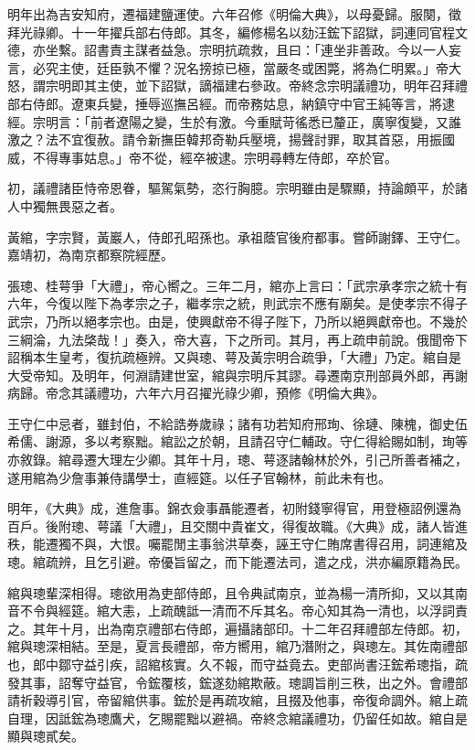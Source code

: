 \begin{pinyinscope}
明年出為吉安知府，遷福建鹽運使。六年召修《明倫大典》，以母憂歸。服闋，徵拜光祿卿。十一年擢兵部右侍郎。其冬，編修楊名以劾汪鋐下詔獄，詞連同官程文德，亦坐繫。詔書責主謀者益急。宗明抗疏救，且曰：「連坐非善政。今以一人妄言，必究主使，廷臣孰不懼？況名搒掠已極，當嚴冬或困斃，將為仁明累。」帝大怒，謂宗明即其主使，並下詔獄，謫福建右參政。帝終念宗明議禮功，明年召拜禮部右侍郎。遼東兵變，捶辱巡撫呂經。而帝務姑息，納鎮守中官王純等言，將逮經。宗明言：「前者遼陽之變，生於有激。今重賦苛徭悉已釐正，廣寧復變，又誰激之？法不宜復赦。請令新撫臣韓邦奇勒兵壓境，揚聲討罪，取其首惡，用振國威，不得專事姑息。」帝不從，經卒被逮。宗明尋轉左侍郎，卒於官。

初，議禮諸臣恃帝恩眷，驅駕氣勢，恣行胸臆。宗明雖由是驟顯，持論頗平，於諸人中獨無畏惡之者。

黃綰，字宗賢，黃巖人，侍郎孔昭孫也。承祖蔭官後府都事。嘗師謝鐸、王守仁。嘉靖初，為南京都察院經歷。

張璁、桂萼爭「大禮」，帝心嚮之。三年二月，綰亦上言曰：「武宗承孝宗之統十有六年，今復以陛下為孝宗之子，繼孝宗之統，則武宗不應有廟矣。是使孝宗不得子武宗，乃所以絕孝宗也。由是，使興獻帝不得子陛下，乃所以絕興獻帝也。不幾於三綱淪，九法棨哉！」奏入，帝大喜，下之所司。其月，再上疏申前說。俄聞帝下詔稱本生皇考，復抗疏極辨。又與璁、萼及黃宗明合疏爭，「大禮」乃定。綰自是大受帝知。及明年，何淵請建世室，綰與宗明斥其謬。尋遷南京刑部員外郎，再謝病歸。帝念其議禮功，六年六月召擢光祿少卿，預修《明倫大典》。

王守仁中忌者，雖封伯，不給誥券歲祿；諸有功若知府邢珣、徐璉、陳槐，御史伍希儒、謝源，多以考察黜。綰訟之於朝，且請召守仁輔政。守仁得給賜如制，珣等亦敘錄。綰尋遷大理左少卿。其年十月，璁、萼逐諸翰林於外，引己所善者補之，遂用綰為少詹事兼侍講學士，直經筵。以任子官翰林，前此未有也。

明年，《大典》成，進詹事。錦衣僉事聶能遷者，初附錢寧得官，用登極詔例還為百戶。後附璁、萼議「大禮」，且交關中貴崔文，得復故職。《大典》成，諸人皆進秩，能遷獨不與，大恨。囑罷閒主事翁洪草奏，誣王守仁賄席書得召用，詞連綰及璁。綰疏辨，且乞引避。帝優旨留之，而下能遷法司，遣之戍，洪亦編原籍為民。

綰與璁輩深相得。璁欲用為吏部侍郎，且令典試南京，並為楊一清所抑，又以其南音不令與經筵。綰大恚，上疏醜詆一清而不斥其名。帝心知其為一清也，以浮詞責之。其年十月，出為南京禮部右侍郎，遍攝諸部印。十二年召拜禮部左侍郎。初，綰與璁深相結。至是，夏言長禮部，帝方嚮用，綰乃潛附之，與璁左。其佐南禮部也，郎中鄒守益引疾，詔綰核實。久不報，而守益竟去。吏部尚書汪鋐希璁指，疏發其事，詔奪守益官，令鋐覆核，鋐遂劾綰欺蔽。璁調旨削三秩，出之外。會禮部請祈穀導引官，帝留綰供事。鋐於是再疏攻綰，且掇及他事，帝復命調外。綰上疏自理，因詆鋐為璁鷹犬，乞賜罷黜以避禍。帝終念綰議禮功，仍留任如故。綰自是顯與璁貳矣。


\end{pinyinscope}
